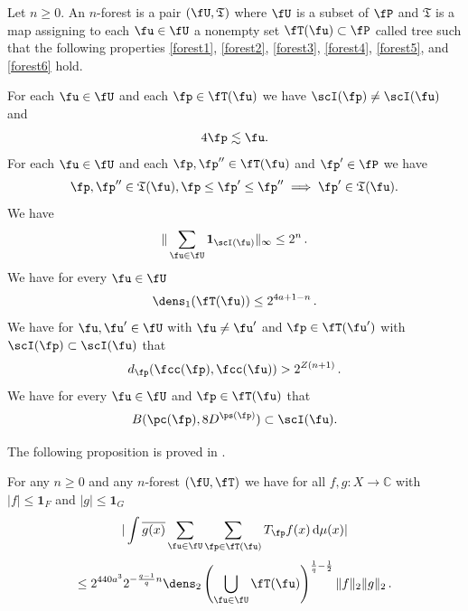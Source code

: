 Let $n\ge 0$.
An $n$-forest is a pair $(\fU, \mathfrak{T})$
where $\fU$ is a subset of $\fP$
and $\mathfrak{T}$ is a map assigning to
each $\fu\in \fU$ a nonempty set $\fT (\fu)\subset \fP$ called tree
such that the following properties
\eqref{forest1}, \eqref{forest2},
\eqref{forest3},
\eqref{forest4},
\eqref{forest5}, and
\eqref{forest6}
hold.

For each $\fu\in \fU$ and each $\fp\in \fT(\fu)$
we have $\scI(\fp) \ne \scI(\fu)$ and
\begin{equation}\label{forest1}
    4\fp\lesssim \fu.
\end{equation}
For each $\fu \in \fU$ and each $\fp,\fp''\in \fT(\fu)$ and $\fp'\in \fP$
we have
\begin{equation}\label{forest2}
    \fp, \fp'' \in \mathfrak{T}(\fu), \fp \leq \fp' \leq \fp'' \implies \fp' \in \mathfrak{T}(\fu).
\end{equation}
We have
\begin{equation}\label{forest3}
   \|\sum_{\fu\in \fU} \mathbf{1}_{\scI(\fu)}\|_\infty \leq 2^n\,.
\end{equation}
We have for every $\fu\in \fU$
\begin{equation}\label{forest4}
    \dens_1(\fT(\fu))\le 2^{4a + 1-n}\, .
\end{equation}
We have for $\fu, \fu'\in \fU$ with $\fu\neq \fu'$ and $\fp\in \fT(\fu')$ with $\scI(\fp)\subset \scI(\fu)$ that
\begin{equation}\label{forest5}
    d_{\fp}(\fcc(\fp), \fcc(\fu))>2^{Z(n+1)}\, .
\end{equation}
We have for every $\fu\in \fU$ and $\fp\in \fT(\fu)$ that
\begin{equation}\label{forest6}
    B(\pc(\fp), 8D^{\ps(\fp)})\subset \scI(\fu).
\end{equation}


The following proposition is proved in .
\begin{proposition}
\label{forest-operator}
\leanok
{}
For any $n\ge 0$ and any $n$-forest $(\fU,\fT)$ we have for all $f,g: X \to \mathbb{C}$ with $|f| \le \mathbf{1}_F$ and $|g| \le \mathbf{1}_G$
$$
    | \int \overline{g(x)} \sum_{\fu\in \fU} \sum_{\fp\in \fT(\fu)} T_{\fp} f(x) \, \mathrm{d}\mu(x)|
$$
$$
    \le
    2^{440a^3}2^{-\frac{q-1}{q} n} \dens_2\left(\bigcup_{\fu\in \fU}\fT(\fu)\right)^{\frac{1}{q}-\frac{1}{2}} \|f\|_2 \|g\|_2 \,.
$$
\end{proposition}


